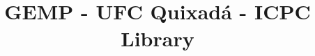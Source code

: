 \documentclass[10pt]{article}
\title{\vspace{-4ex}\Large{GEMP - UFC Quixadá - ICPC Library}}
\author{}
\date{}
\begin{document}
\begin{landscape}
\begin{multicols}{2}

\maketitle
\vspace{-13ex}
\tableofcontents
\pagestyle{fancy}



\end{multicols}
\end{landscape}
\end{document}
